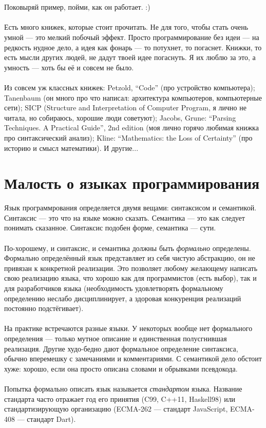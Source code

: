 \documentclass[11pt]{book}
\begin{document}
\\ \\
Поковыряй пример, пойми, как он работает. :)
\\ \\
Есть много книжек, которые стоит прочитать.
Не для того, чтобы стать очень умной --- это мелкий побочый эффект.
Просто программирование без идеи --- на редкость нудное дело, а идея как фонарь --- то потухнет, то погаснет.
Книжки, то есть мысли других людей, не дадут твоей идее погаснуть.
Я их люблю за это, а умность --- хоть бы её и совсем не было.
\\ \\
Из совсем уж классных книжек:
Petzold, ``Code'' (про устройство компьютера);
Tanenbaum (он много про что написал: архитектура компьютеров, компьютерные сети);
SICP (Structure and Interpretation of Computer Program, я лично не читала, но собираюсь, хорошие люди советуют);
Jacobs, Grune: ``Parsing Techniques. A Practical Guide'', 2nd edition (моя лично горячо любимая книжка про синтаксический анализ);
Kline: ``Mathematics: the Loss of Certainty'' (про историю и смысл математики).
И другие...

\tableofcontents



\chapter{Малость о языках программирования}
Язык программрования определяется двумя вещами: синтаксисом и семантикой.
Синтаксис --- это что на языке можно сказать.
Семантика --- это как следует понимать сказанное.
Синтаксис подобен форме, семантика --- сути.
\\ \\
По-хорошему, и синтаксис, и семантика должны быть \emph{формально} определены.
Формально определённый язык представляет из себя чистую абстракцию, он не привязан к конкретной реализации.
Это позволяет любому желающему написать свою реализацию языка,
что хорошо как для программистов (есть выбор),
так и для разработчиков языка (необходимость удовлетворять формальному определению неслабо дисциплинирует,
а здоровая конкуренция реализаций постоянно подстёгивает).
\\ \\
На практике встречаются разные языки.
У некоторых вообще нет формального определения --- только мутное описание и единственная полусгнившая реализация.
Другие худо-бедно дают формальное определение синтаксиса, обычно вперемешку с замечаниями и комментариями.
С семантикой дело обстоит хуже: хорошо, если она просто описана словами и обрывками псевдокода.
\\ \\
Попытка формально описать язык называется \emph{стандартом} языка.
Название стандарта часто отражает год его принятия (C99, C++11, Haskell98)
или стандартизирующую организацию (ECMA-262 --- стандарт JavaScript, ECMA-408 --- стандарт Dart).
\end{document}
